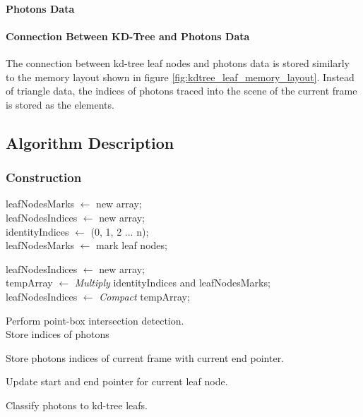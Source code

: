 \paragraph{Photons Data}

\paragraph{Connection Between KD-Tree and Photons Data}

The connection between kd-tree leaf nodes and photons data is stored similarly to the memory layout shown in figure \ref{fig:kdtree_leaf_memory_layout}. Instead of triangle data, the indices of photons traced into the scene of the current frame is stored as the elements.


\subsection{Algorithm Description}

\subsubsection{Construction}

\begin{spacing}{1.3}

\begin{algorithm}[H]
	\SetAlgoLined

	leafNodesMarks 	\(\leftarrow\) new array; \\
	leafNodesIndices 	\(\leftarrow\) new array; \\
	identityIndices 	\(\leftarrow\) (0, 1, 2 ... n); \\

	 {
		leafNodesMarks \(\leftarrow\) mark leaf nodes; \\
	}

	leafNodesIndices \( \leftarrow \) new array;	 \\
	tempArray \(\leftarrow\) \emph{Multiply} identityIndices and leafNodesMarks; \\
	leafNodesIndices \( \leftarrow \) \emph{Compact} tempArray;
	
	 {
		 {
			Perform point-box intersection detection. \\
			Store indices of photons
		}
	}
	
	 {
		 {
			Store photons indices of current frame with current end pointer.
		}

		Update start and end pointer for current leaf node.
	}
	
	\caption{Classify photons to kd-tree leafs. } 	
	\label{algo:build_kdleaf_photons}
\end{algorithm}

\end{spacing}

